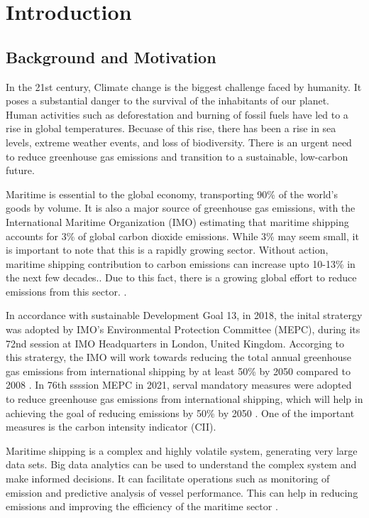 \chapter{Introduction}
\setcounter{page}{1}

\section{Background and Motivation}

In the 21st century, Climate change is the biggest challenge faced by humanity. It poses a substantial danger to the survival of the inhabitants of our planet.
Human activities such as deforestation and burning of fossil fuels have led to a rise in global temperatures.
Becuase of this rise, there has been a rise in sea levels, extreme weather events, and loss of biodiversity.
There is an urgent need to reduce greenhouse gas emissions and transition to a sustainable, low-carbon future.

Maritime is essential to the global economy, transporting 90\% of the world's goods by volume.
It is also a major source of greenhouse gas emissions, with the International Maritime Organization (IMO)
estimating that maritime shipping accounts for 3\% of global carbon dioxide emissions.
While 3\% may seem small, it is important to note that this is a rapidly growing sector.
Without action, maritime shipping contribution to carbon emissions can increase upto 10-13\% in the next few decades..
Due to this fact, there is a growing global effort to reduce emissions from this sector. \autocite{king_anthony_2022}.

In accordance with sustainable Development Goal 13, in 2018, the inital stratergy was adopted by IMO's Environmental Protection Committee (MEPC),
during its 72nd session at IMO Headquarters in London, United Kingdom. Accorging to this stratergy,
the IMO will work towards reducing the total annual greenhouse gas emissions from international shipping by at least 50\% by 2050 compared to 2008 \autocite{imo-2018}.
In 76th ssssion MEPC in 2021, serval mandatory measures were adopted to reduce greenhouse gas emissions from international shipping,
which will help in achieving the goal of reducing emissions by 50\% by 2050 \autocite{imo-2021}. One of the important measures is the carbon intensity indicator (CII).

Maritime shipping is a complex and highly volatile system, generating very large data sets.
Big data analytics can be used to understand the complex system and make informed decisions.
It can facilitate operations such as monitoring of emission and predictive analysis of vessel performance.
This can help in reducing emissions and improving the efficiency of the maritime sector \autocite{ZAMAN2017537}.




